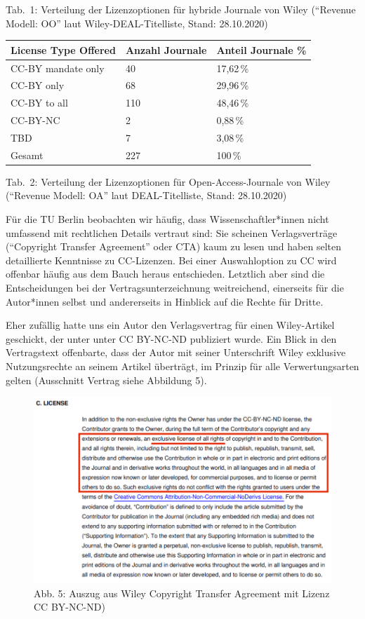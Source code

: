 \documentclass[a4paper,
fontsize=11pt,
oneside,
numbers=noperiodatend,
parskip=half-,
bibliography=totoc,
final
]{scrartcl}
\begin{document}
Tab.~1: Verteilung der Lizenzoptionen für hybride Journale von Wiley
(\enquote{Revenue Modell: OO} laut Wiley-DEAL-Titelliste, Stand:
28.10.2020)

\begin{longtable}[]{@{}lll@{}}
\toprule
License Type Offered & Anzahl Journale & Anteil Journale
\%\tabularnewline
\midrule
\endhead
CC-BY mandate only & 40 & 17,62\,\%\tabularnewline
CC-BY only & 68 & 29,96\,\%\tabularnewline
CC-BY to all & 110 & 48,46\,\%\tabularnewline
CC-BY-NC & 2 & 0,88\,\%\tabularnewline
TBD & 7 & 3,08\,\%\tabularnewline
Gesamt & 227 & 100\,\%\tabularnewline
\bottomrule
\end{longtable}

Tab.~2: Verteilung der Lizenzoptionen für Open-Access-Journale von Wiley
(\enquote{Revenue Modell: OA} laut DEAL-Titelliste, Stand: 28.10.2020)

Für die TU Berlin beobachten wir häufig, dass Wissenschaftler*innen
nicht umfassend mit rechtlichen Details vertraut sind: Sie scheinen
Verlagsverträge (\enquote{Copyright Transfer Agreement} oder CTA) kaum
zu lesen und haben selten detaillierte Kenntnisse zu CC-Lizenzen. Bei
einer Auswahloption zu CC wird offenbar häufig aus dem Bauch heraus
entschieden. Letztlich aber sind die Entscheidungen bei der
Vertragsunterzeichnung weitreichend, einerseits für die Autor*innen
selbst und andererseits in Hinblick auf die Rechte für Dritte.

Eher zufällig hatte uns ein Autor den Verlagsvertrag für einen
Wiley-Artikel geschickt, der unter unter CC BY-NC-ND publiziert wurde.
Ein Blick in den Vertragstext offenbarte, dass der Autor mit seiner
Unterschrift Wiley exklusive Nutzungsrechte an seinem Artikel überträgt,
im Prinzip für alle Verwertungsarten gelten (Ausschnitt Vertrag siehe
Abbildung 5).

\begin{figure}
\centering
\includegraphics{img/CTAwiley.png}
\caption{Abb. 5: Auszug aus Wiley Copyright Transfer Agreement mit
Lizenz CC BY-NC-ND)}
\end{figure}
\end{document}
